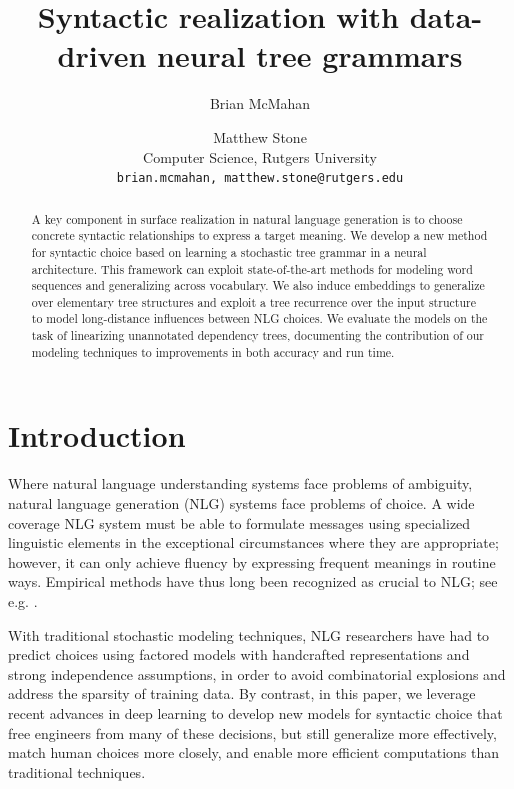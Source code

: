 \documentclass[11pt]{article}
\title{Syntactic realization with data-driven neural tree grammars}
\author{Brian McMahan \and Matthew Stone \\
   Computer Science, Rutgers University \\
   {\tt brian.mcmahan, matthew.stone@rutgers.edu}}
\date{}
\begin{document}
\maketitle

\begin{abstract}

A key component in surface realization in natural language generation
is to choose concrete syntactic relationships to express a target
meaning.
%
We develop a new method for syntactic choice based on learning a
stochastic tree grammar in a neural architecture.
%
This framework can exploit state-of-the-art methods for modeling word
sequences and generalizing across vocabulary.
%
We also induce embeddings to generalize over elementary tree
structures and exploit a tree recurrence over the input structure to
model long-distance influences between NLG choices.
%
We evaluate the models on the task of linearizing unannotated
dependency trees, documenting the contribution of our modeling
techniques to improvements in both accuracy and run time.

\end{abstract}

\section{Introduction}



Where natural language understanding systems face problems of
ambiguity, natural language generation (NLG) systems face problems of
choice. A wide coverage NLG system must be able to formulate messages
using specialized linguistic elements in the exceptional circumstances
where they are appropriate; however, it can only achieve fluency by
expressing frequent meanings in routine ways. Empirical methods have
thus long been recognized as crucial to NLG; see
e.g. .

With traditional stochastic modeling techniques, NLG researchers have
had to predict choices using factored models with handcrafted
representations and strong independence assumptions, in order to avoid
combinatorial explosions and address the sparsity of training data.
%
By contrast, in this paper, we leverage recent advances in deep
learning to develop new models for syntactic choice that free
engineers from many of these decisions, but still generalize more
effectively, match human choices more closely, and enable more
efficient computations than traditional techniques.
\end{document}
